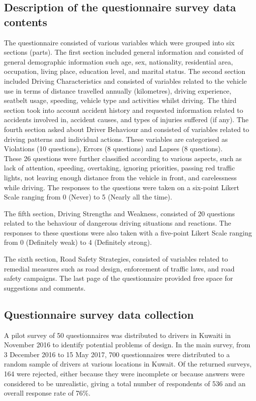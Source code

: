\documentclass[preprint,12pt,a4paper,authoryear]{elsarticle}
\begin{document}
\subsection{Description of the questionnaire survey data contents}
 The questionnaire consisted of various variables which were grouped into six sections (parts). The first section included general information and consisted of general demographic information such age, sex, nationality, residential area, occupation, living place, education level, and marital status. The second section included Driving Characteristics and consisted of variables related to the vehicle use in terms of distance travelled annually (kilometres), driving experience, seatbelt usage, speeding, vehicle type and activities whilst driving. The third section took into account accident history and requested information related to accidents involved in, accident causes, and types of injuries suffered (if any). The fourth section asked about Driver Behaviour and consisted of variables related to driving patterns and individual actions. These variables are categorised as Violations (10 questions), Errors (8 questions) and Lapses (8 questions). 
\\
These 26 questions were further classified according to various aspects, such as lack of attention, speeding, overtaking, ignoring priorities, passing red traffic lights, not leaving enough distance from the vehicle in front, and carelessness while driving. The responses to the questions were taken on a six-point Likert Scale ranging from 0 (Never) to 5 (Nearly all the time). 

The fifth section, Driving Strengths and Weakness, consisted of 20 questions related to the behaviour of dangerous driving situations and reactions. The responses to these questions were also taken with a five-point Likert Scale ranging from 0 (Definitely weak) to 4 (Definitely strong). 

The sixth section, Road Safety Strategies, consisted of variables related to remedial measures such as road design, enforcement of traffic laws, and road safety campaigns. The last page of the questionnaire provided free space for suggestions and comments. \\

\subsection{Questionnaire survey data collection}

A pilot survey of 50 questionnaires was distributed to drivers in Kuwaiti in November 2016 to identify potential problems of design. In the main survey, from 3 December 2016 to 15 May 2017, 700 questionnaires were distributed to a random sample of drivers at various locations in Kuwait.  Of the returned surveys, 164  were rejected, either because they were incomplete or because answers were considered to be unrealistic, giving a total number of respondents of 536 and an overall response rate of 76\%. 
        
\end{document}
